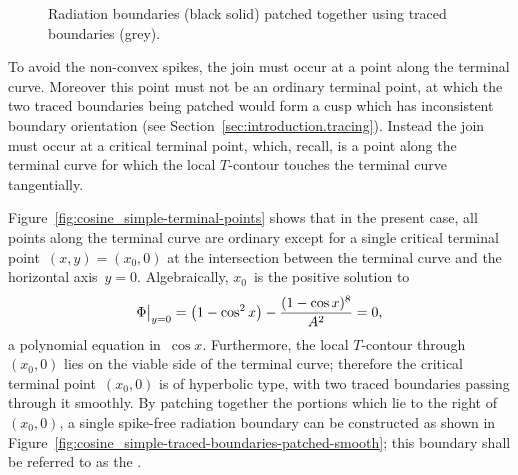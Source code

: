 \begin{figure}
  \newcommand*{\subfigurewidth}{0.36\textwidth}
  \centering
  \begin{subfigure}[t]{\subfigurewidth}
  \end{subfigure}
  \begin{subfigure}[t]{\subfigurewidth}
  \end{subfigure}
  \caption{
    Radiation boundaries (black solid) patched together
    using traced boundaries (grey).
  }
  \label{fig:cosine_simple-traced-boundaries-patched}
\end{figure}

\begin{figure}
\end{figure}

To avoid the non-convex spikes,
the join must occur at a point along the terminal curve.
Moreover this point must not be an ordinary terminal point,
at which the two traced boundaries being patched
would form a cusp which has inconsistent boundary orientation
(see Section~\ref{sec:introduction.tracing}).
Instead the join must occur at a critical terminal point,
which, recall, is a point along the terminal curve
for which the local $T$-contour touches the terminal curve tangentially.

Figure~\ref{fig:cosine_simple-terminal-points} shows that in the present case,
all points along the terminal curve are ordinary
except for a single critical terminal point~$(x, y) = (x_0, 0)$
at the intersection between the terminal curve
and the horizontal axis~$y = 0$.
Algebraically, $x_0$~is the positive solution to
\begin{equation}
  \eval[\big]{\Phi}_{y=0}
  = \roundbr*{1 - \cos^2 x} - \frac{(1 - \cos x)^8}{A^2}
  = 0,
  \label{eq:cosine-simple-critical-terminal-point-x}
\end{equation}
a polynomial equation in~$\cos x$.
Furthermore, the local $T$-contour through~$(x_0, 0)$
lies on the viable side of the terminal curve;
therefore the critical terminal point~$(x_0, 0)$ is of hyperbolic type,
with two traced boundaries passing through it smoothly.
By patching together the portions which lie to the right of~$(x_0, 0)$,
a single spike-free radiation boundary can be constructed
as shown in Figure~\ref{fig:cosine_simple-traced-boundaries-patched-smooth};
this boundary shall be referred to as the .

